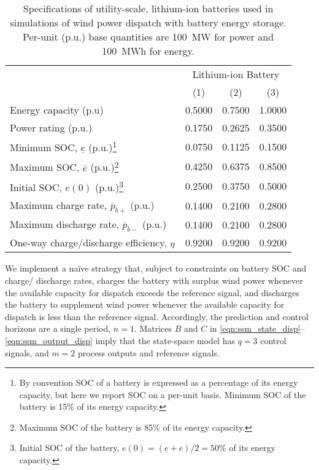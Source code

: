\begin{table}[!b]
\begin{minipage}{\textwidth}		%
	\centering
	\caption{Specifications of utility-scale, lithium-ion batteries used in simulations of wind power dispatch with battery energy storage.  Per-unit (p.u.) base quantities are 100~MW for power and 100~MWh for energy.}
	\label{tbl:bess_specs}
	\begin{tabular}{l r r r}
		\toprule
		& \multicolumn{3}{c}{Lithium-ion Battery} \\
		& \multicolumn{1}{c}{(1)}	& \multicolumn{1}{c}{(2)}	& \multicolumn{1}{c}{(3)}	\\
		\midrule
		Energy capacity (p.u)						& 0.5000	& 0.7500	& 1.0000	\\
		Power rating (p.u.)							& 0.1750	& 0.2625	& 0.3500	\\
		Minimum SOC, $\underline{e}$	(p.u.)\footnote{By convention SOC of a battery is expressed as a percentage of its energy capacity, but here we report SOC on a per-unit basis.  Minimum SOC of the battery is 15\% of its energy capacity.}	& 0.0750	& 0.1125	& 0.1500	\\
		Maximum SOC, $\overline{e}$ (p.u.)\footnote{Maximum SOC of the battery is 85\% of its energy capacity.}	& 0.4250	& 0.6375	& 0.8500	\\
		Initial SOC, $e(0)$ (p.u.)\footnote{Initial SOC of the battery, $e(0) = (\underline{e}+\overline{e})/2 = 50\%$ of its energy capacity.}	& 0.2500	& 0.3750	& 0.5000	\\
		Maximum charge rate, $\overline{p}_{b+}$ (p.u.)	& 0.1400	& 0.2100	& 0.2800	\\
		Maximum discharge rate, $\overline{p}_{b-}$ (p.u.)	& 0.1400	& 0.2100	& 0.2800	\\
		One-way charge/discharge efficiency, $\eta$		& 0.9200	& 0.9200	& 0.9200	\\
		\bottomrule
	\end{tabular}
\end{minipage}
\end{table}

We implement a na\"ive strategy that, subject to constraints on battery SOC and charge/ discharge rates, charges the battery with surplus wind power whenever the available capacity for dispatch exceeds the reference signal, and discharges the battery to supplement wind power whenever the available capacity for dispatch is less than the reference signal.  Accordingly, the prediction and control horizons are a single period, $n=1$.  Matrices $B$ and $C$ in \eqref{eqn:ssm_state_disp}--\eqref{eqn:ssm_output_disp} imply that the state-space model has $q=3$ control signals, and $m=2$ process outputs and reference signals.

